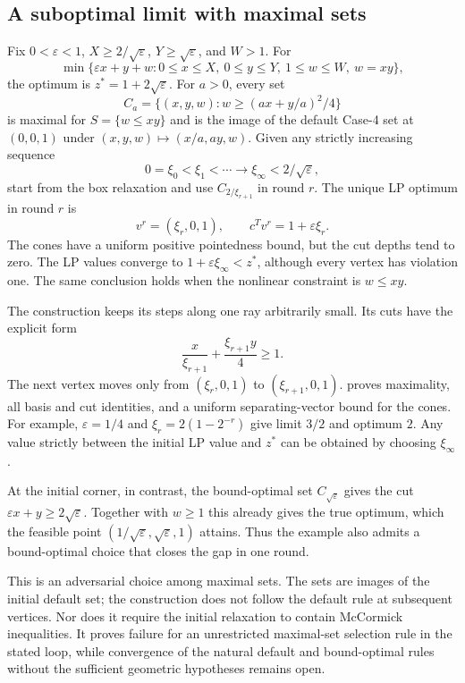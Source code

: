 \subsection{A suboptimal limit with maximal sets}

\begin{theorem}\label{cv:stalling}
Fix $0<\varepsilon<1$, $X\ge2/\sqrt\varepsilon$,
$Y\ge\sqrt\varepsilon$, and $W>1$. For
\[
 \min\{\varepsilon x+y+w:
     0\le x\le X,\ 0\le y\le Y,\ 1\le w\le W,\ w=xy\},
\]
the optimum is $z^*=1+2\sqrt\varepsilon$. For $a>0$, every set
\[
 C_a=\{(x,y,w):w\ge(ax+y/a)^2/4\}
\]
is maximal for $S=\{w\le xy\}$ and is the image of the default Case-4
set at $(0,0,1)$ under $(x,y,w)\mapsto(x/a,ay,w)$.
Given any strictly increasing sequence
\[
 0=\xi_0<\xi_1<\cdots\longrightarrow\xi_\infty<2/\sqrt\varepsilon,
\]
start from the box relaxation and use $C_{2/\xi_{r+1}}$ in round $r$.
The unique LP optimum in round $r$ is
\[
 v^r=(\xi_r,0,1),\qquad c^Tv^r=1+\varepsilon\xi_r.
\]
The cones have a uniform positive pointedness bound, but the cut depths
tend to zero. The LP values converge to
$1+\varepsilon\xi_\infty<z^*$, although every vertex has violation one.
The same conclusion holds when the nonlinear constraint is $w\le xy$.
\end{theorem}

The construction keeps its steps along one ray arbitrarily small. Its
cuts have the explicit form
\[
 \frac{x}{\xi_{r+1}}+\frac{\xi_{r+1}y}{4}\ge1.
\]
The next vertex moves only from $(\xi_r,0,1)$ to $(\xi_{r+1},0,1)$.
 proves maximality, all basis and cut identities,
and a uniform separating-vector bound for the cones. For example,
$\varepsilon=1/4$ and $\xi_r=2(1-2^{-r})$ give limit $3/2$ and optimum
$2$. Any value strictly between the initial LP value and $z^*$ can be
obtained by choosing $\xi_\infty$.

At the initial corner, in contrast, the bound-optimal set
$C_{\sqrt\varepsilon}$ gives the cut
$\varepsilon x+y\ge2\sqrt\varepsilon$. Together with $w\ge1$ this
already gives the true optimum, which the feasible point
$(1/\sqrt\varepsilon,\sqrt\varepsilon,1)$ attains. Thus the example
also admits a bound-optimal choice that closes the gap in one round.

This is an adversarial choice among maximal sets. The sets are images of
the initial default set; the construction does not follow the default
rule at subsequent vertices. Nor does it require the initial relaxation
to contain McCormick inequalities. It proves failure for an unrestricted
maximal-set selection rule in the stated loop, while convergence of the
natural default and bound-optimal rules without the sufficient geometric
hypotheses remains open.

